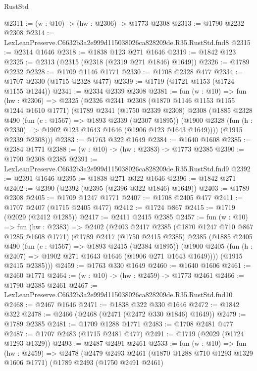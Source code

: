 \begin{lexlean}{RustStd}
\begin{coremodule}
@2311 := (w : @10) -> (hw : @2306) -> @1773 @2308
@2313 := @1790 @2232 @2308
@2314 := LexLeanPreserve.C6632b3a2e999d115038026ca828209de.R35.RustStd.fnd8
@2315 := @2314 @1646
@2318 := @1838 @123 @271 @1646
@2319 := @1842 @123
@2325 := @2313 (@2315 (@2318 (@2319 @271 @1846) @1649))
@2326 := @1789 @2232
@2328 := @1709 @1146 @1771
@2330 := @1708 @2328 @477
@2334 := @1707 @2330 (@1715 @2328 @477)
@2339 := @1719 (@1721 @1153 (@1724 @1155 @1244))
@2341 := @2334 @2339 @2308
@2381 := fun (w : @10) =>
  fun (hw : @2306) =>
  @2325
    (@2326
      @2341
      @2308
      (@1870 @1146 @1153 @1155 @1244 @1610 @1771)
      (@1789
        @2341
        (@1750 @2339 @2308)
        @2308
        (@1885
          @2328
          @490
          (fun (c : @1567) => @1893 @2339 (@2307 @1895))
          (@1900 @2328 (fun (h : @2330) => @1902 @123 @1643 @1646 (@1906 @123 @1643 @1649))))
        (@1915 @2339 @2308)))
@2383 := @1763 @322 @1649
@2384 := @1640 @1608
@2385 := @2384 @1771
@2388 := (w : @10) -> (hw : @2383) -> @1773 @2385
@2390 := @1790 @2308 @2385
@2391 := LexLeanPreserve.C6632b3a2e999d115038026ca828209de.R35.RustStd.fnd9
@2392 := @2391 @1646
@2395 := @1838 @271 @322 @1646
@2396 := @1842 @271
@2402 := @2390 (@2392 (@2395 (@2396 @322 @1846) @1649))
@2403 := @1789 @2308
@2405 := @1709 @1247 @1771
@2407 := @1708 @2405 @477
@2411 := @1707 @2407 (@1715 @2405 @477)
@2412 := @1724 @867
@2415 := @1719 (@2029 (@2412 @1285))
@2417 := @2411 @2415 @2385
@2457 := fun (w : @10) =>
  fun (hw : @2383) =>
  @2402
    (@2403
      @2417
      @2385
      (@1870 @1247 @710 @867 @1285 @1608 @1771)
      (@1789
        @2417
        (@1750 @2415 @2385)
        @2385
        (@1885
          @2405
          @490
          (fun (c : @1567) => @1893 @2415 (@2384 @1895))
          (@1900 @2405 (fun (h : @2407) => @1902 @271 @1643 @1646 (@1906 @271 @1643 @1649))))
        (@1915 @2415 @2385)))
@2459 := @1763 @330 @1649
@2460 := @1640 @1606
@2461 := @2460 @1771
@2464 := (w : @10) -> (hw : @2459) -> @1773 @2461
@2466 := @1790 @2385 @2461
@2467 := LexLeanPreserve.C6632b3a2e999d115038026ca828209de.R35.RustStd.fnd10
@2468 := @2467 @1646
@2471 := @1838 @322 @330 @1646
@2472 := @1842 @322
@2478 := @2466 (@2468 (@2471 (@2472 @330 @1846) @1649))
@2479 := @1789 @2385
@2481 := @1709 @1288 @1771
@2483 := @1708 @2481 @477
@2487 := @1707 @2483 (@1715 @2481 @477)
@2491 := @1719 (@2029 (@1724 @1293 @1329))
@2493 := @2487 @2491 @2461
@2533 := fun (w : @10) =>
  fun (hw : @2459) =>
  @2478
    (@2479
      @2493
      @2461
      (@1870 @1288 @710 @1293 @1329 @1606 @1771)
      (@1789
        @2493
        (@1750 @2491 @2461)

\end{coremodule}
\end{lexlean}
